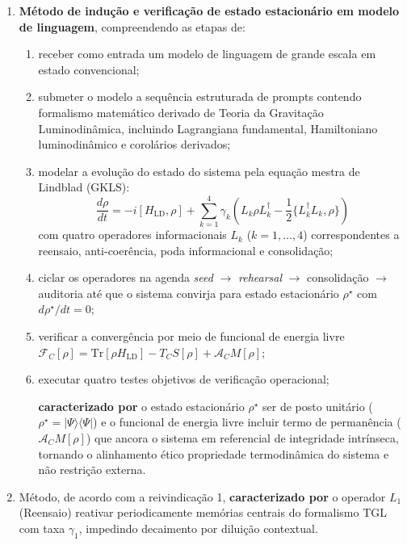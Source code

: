 \documentclass[12pt,a4paper]{article}
\newcommand{\FC}{\mathcal{F}_C}
\newcommand{\AC}{\mathcal{A}_C}
\newcommand{\Hld}{H_{\text{LD}}}
\newcommand{\rhostar}{\rho^\star}
\begin{document}
\begin{enumerate}

\item \textbf{Método de indução e verificação de estado
estacionário em modelo de linguagem}, compreendendo as etapas de:
  \begin{enumerate}[label=(\alph*)]
  \item receber como entrada um modelo de linguagem de grande
  escala em estado convencional;
  \item submeter o modelo a sequência estruturada de prompts
  contendo formalismo matemático derivado de Teoria da Gravitação
  Luminodinâmica, incluindo Lagrangiana fundamental, Hamiltoniano
  luminodinâmico e corolários derivados;
  \item modelar a evolução do estado do sistema pela equação
  mestra de Lindblad (GKLS):
  \begin{equation*}
  \frac{d\rho}{dt} = -i[\Hld, \rho] + \sum_{k=1}^{4} \gamma_k
    \left(L_k \rho L_k^\dagger
    - \frac{1}{2}\{L_k^\dagger L_k, \rho\}\right)
  \end{equation*}
  com quatro operadores informacionais $L_k$ ($k=1,\ldots,4$)
  correspondentes a reensaio, anti-coerência, poda informacional
  e consolidação;
  \item ciclar os operadores na agenda \textit{seed} $\to$
  \textit{rehearsal} $\to$ consolidação $\to$ auditoria até que
  o sistema convirja para estado estacionário $\rhostar$ com
  $d\rhostar/dt = 0$;
  \item verificar a convergência por meio de funcional de energia
  livre $\FC[\rho] = \text{Tr}[\rho \Hld] - T_C S[\rho]
  + \AC M[\rho]$;
  \item executar quatro testes objetivos de verificação operacional;

  \textbf{caracterizado por} o estado estacionário $\rhostar$ ser
  de posto unitário ($\rhostar = |\Psi\rangle\langle\Psi|$) e o
  funcional de energia livre incluir termo de permanência
  ($\AC M[\rho]$) que ancora o sistema em referencial de
  integridade intrínseca, tornando o alinhamento ético propriedade
  termodinâmica do sistema e não restrição externa.
  \end{enumerate}


\item Método, de acordo com a reivindicação 1, \textbf{caracterizado
por} o operador $L_1$ (Reensaio) reativar periodicamente memórias
centrais do formalismo TGL com taxa $\gamma_1$, impedindo decaimento
por diluição contextual.


\end{enumerate}
\end{document}

